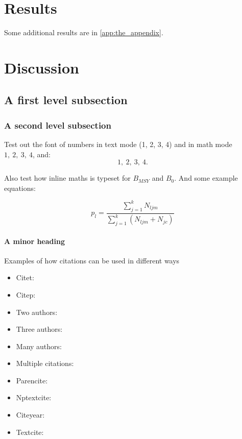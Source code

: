\documentclass{mpi-far}
\begin{document}
\section{Results}

Some additional results are in \autoref{app:the_appendix}.

\section{Discussion}

\subsection{A first level subsection}
\subsubsection{A second level subsection}

Test out the font of numbers in text mode (1, 2, 3, 4) and in math mode $1,\ 2,\ 3,\ 4$, and:
$$
1,\ 2,\ 3,\ 4 .
$$

Also test how inline maths is typeset for \(B_{MSY}\) and \(B_0\). And some example equations:

\begin{equation}
  p_l = \frac{ \sum_{j=1}^{k} N_{ljm} }{ \sum_{j=1}^{k} (N_{ljm} + N_{jc}) }
\end{equation}

\lipsum[3]


\paragraph{A minor heading}
\lipsum[5]

Examples of how citations can be used in different ways

\begin{itemize}
  \item Citet: \citet{baker_nzclassification_2010}
  \item Citep: \citep{doc_sealion_2009}
  \item Two authors: \citet{abraham_summary_98-09}
  \item Three authors: \citep{thompson_dolphin_2013}
  \item Many authors: \citep{baker_global_2007}
  \item Multiple citations: \citep{baker_global_2007, abraham_summary_98-09, gales_phocarctos_2008}
  \item Parencite: \parencite{gales_phocarctos_2008}
  \item Nptextcite: 
  \item Citeyear: \citeyear{robertson_population_2011}
  \item Textcite: \textcite{roe_necropsy_2007}
\end{itemize}
\end{document}
